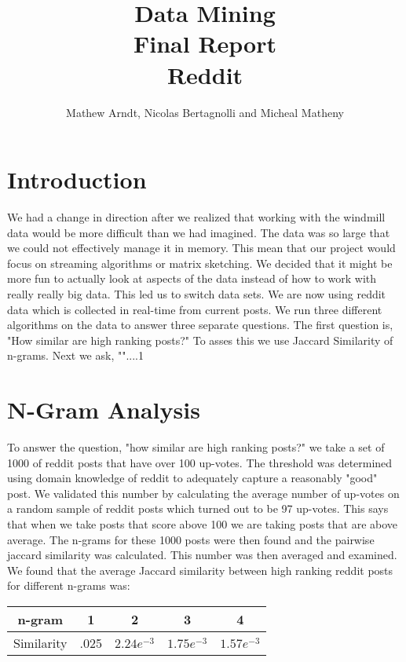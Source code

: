 \documentclass[12pt]{article}
\numberwithin{equation}{section}
\begin{document}
\title{Data Mining \\ Final Report \\ Reddit }
\author{Mathew Arndt, Nicolas Bertagnolli and Micheal Matheny}
\date{}
\maketitle
{}
\newpage
  
\section*{Introduction}
		We had a change in direction after we realized that working with the windmill data would  be more difficult than we had imagined.  The data was so large that we could not effectively manage it in memory. This mean that our project would focus on streaming algorithms or matrix sketching.  We decided that it might be more fun to actually look at aspects of the data instead of how to work with really really big data.  This led us to switch data sets.  We are now using reddit data which is collected in real-time from current posts.  We run three different algorithms on the data to answer three separate questions. The first question is, "How similar are high ranking posts?"  To asses this we use Jaccard Similarity of n-grams.  Next we ask, ""....1
		
		
\section*{N-Gram Analysis}
	To answer the question, "how similar are high ranking posts?" we take a set of 1000 of reddit posts that have over 100 up-votes.  The threshold was determined using domain knowledge of reddit to adequately capture a reasonably "good" post.  We validated this number by calculating the average number of up-votes on a random sample of reddit posts which turned out to be 97 up-votes.  This says that when we take posts that score above 100 we are taking posts that are above average.   The n-grams for these 1000 posts were then found and the pairwise jaccard similarity was calculated.  This number was then averaged and examined.  We found that the average Jaccard similarity between high ranking reddit posts for different n-grams was:\newline
	\begin{table}[h!]
	  \begin{tabular}{c | c c c c}
	  n-gram & 1 & 2 & 3 & 4\\
	  \hline
	  Similarity & .025 & $2.24e^{-3}$ & $1.75e^{-3}$ & $1.57e^{-3}$
	  \end{tabular}
	\end{table}
	
\end{document}
